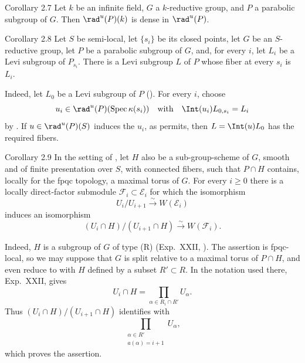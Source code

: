 \begin{sgastatement}{Corollary 2.7}
Let \(k\) be an infinite field, \(G\) a \(k\)-reductive group, and \(P\)
a parabolic subgroup of \(G\).  Then \(\rad^u(P)(k)\) is dense in
\(\rad^u(P)\).
\end{sgastatement}

\begin{sgastatement}{Corollary 2.8}
Let \(S\) be semi-local, let \(\{s_i\}\) be its closed points, let \(G\)
be an \(S\)-reductive group, let \(P\) be a parabolic subgroup of \(G\),
and, for every \(i\), let \(L_i\) be a Levi subgroup of \(P_{s_i}\).
There is a Levi subgroup \(L\) of \(P\) whose fiber at every \(s_i\) is
\(L_i\).
\end{sgastatement}

Indeed, let \(L_0\) be a Levi subgroup of \(P\) ().  For every \(i\),
choose
\[
 u_i\in\rad^u(P)(\operatorname{Spec}\kappa(s_i))
\quad\text{with}\quad
 \Int(u_i)L_{0,s_i}=L_i
\]
by .  If \(u\in\rad^u(P)(S)\) induces the \(u_i\), as  permits,
then \(L=\Int(u)L_0\) has the required fibers.

\begin{sgastatement}{Corollary 2.9}
In the setting of , let \(H\) also be a sub-group-scheme of \(G\),
smooth and of finite presentation over \(S\), with connected fibers, such
that \(P\cap H\) contains, locally for the fpqc topology, a maximal torus
of \(G\).  For every \(i\geq0\) there is a locally direct-factor
submodule \(\mathcal F_i\subset\mathcal E_i\) for which the isomorphism
\[
 U_i/U_{i+1}\xrightarrow{\sim}W(\mathcal E_i)
\]
induces an isomorphism
\[
 (U_i\cap H)/(U_{i+1}\cap H)\xrightarrow{\sim}W(\mathcal F_i).
\]
\end{sgastatement}

Indeed, \(H\) is a subgroup of \(G\) of type (R) (Exp.\ XXII, ).
The assertion is fpqc-local, so we may suppose that \(G\) is split
relative to a maximal torus of \(P\cap H\), and even reduce to  with
\(H\) defined by a subset \(R'\subset R\).  In the notation used there,
Exp.\ XXII,  gives
\[
 U_i\cap H=\prod_{\alpha\in R_i\cap R'}U_\alpha.
\]
Thus \((U_i\cap H)/(U_{i+1}\cap H)\) identifies with
\[
 \prod_{\substack{\alpha\in R'\\a(\alpha)=i+1}}U_\alpha,
\]
which proves the assertion.

